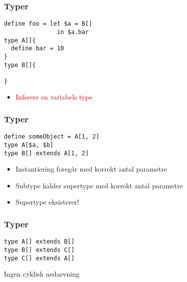 \begin{frame}[fragile]
\frametitle{Typer}
\begin{lstlisting}
define foo = let $a = B[]
               in $a.bar
type A[]{
  define bar = 10
}
type B[]{

}
\end{lstlisting}
\begin{center}

\begin{itemize}                                  
\item \textcolor{red}{Inferere en variabels type}
\end{itemize}

\end{center}
\end{frame}

\begin{frame}[fragile]
\frametitle{Typer}
\begin{lstlisting}
define someObject = A[1, 2]
type A[$a, $b]
type B[] extends A[1, 2]
\end{lstlisting}
\begin{center}
\begin{itemize}                                  
\item Instantiering foregår med korrekt antal parametre
\item Subtype kalder supertype med korrekt antal parametre
\item Supertype eksisterer!
\end{itemize}
\end{center}
\end{frame}

\begin{frame}[fragile]
\frametitle{Typer}
\begin{lstlisting}
type A[] extends B[]
type B[] extends C[]
type C[] extends A[]
\end{lstlisting}

\begin{center}                                 
\item Ingen cyklisk nedarvning
\end{center}
\end{frame}

